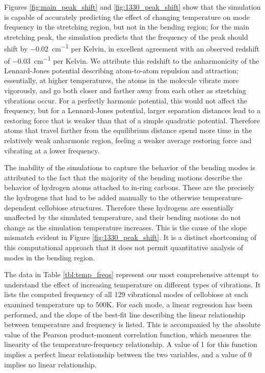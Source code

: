 Figures \ref{fig:main_peak_shift} and \ref{fig:1330_peak_shift} show that the simulation is capable of accurately predicting the effect of changing temperature on mode frequency in the stretching region, but not in the bending region; for the main stretching peak, the simulation predicts that the frequency of the peak should shift by \SI{-0.02}{cm^{-1}} per Kelvin, in excellent agreement with an observed redshift of \SI{-0.03}{cm^{-1}} per Kelvin. We attribute this redshift to the anharmonicity of the Lennard-Jones potential describing atom-to-atom repulsion and attraction; essentially, at higher temperatures, the atoms in the molecule vibrate more vigorously, and go both closer and farther away from each other as stretching vibrations occur. For a perfectly harmonic potential, this would not affect the frequency, but for a Lennard-Jones potential, larger separation distances lead to a restoring force that is weaker than that of a simple quadratic potential. Therefore atoms that travel farther from the equilibrium distance spend more time in the relatively weak anharmonic region, feeling a weaker average restoring force and vibrating at a lower frequency.

The inability of the simulations to capture the behavior of the bending modes is attributed to the fact that the majority of the bending motions describe the behavior of hydrogen atoms attached to in-ring carbons. These are the precisely the hydrogens that had to be added manually to the otherwise temperature-dependent cellobiose structures. Therefore these hydrogens are essentially unaffected by the simulated temperature, and their bending motions do not change as the simulation temperature increases. This is the cause of the slope mismatch evident in Figure \ref{fig:1330_peak_shift}. It is a distinct shortcoming of this computational approach that it does not permit quantitative analysis of modes in the bending region.

The data in Table \ref{tbl:temp_freqs} represent our most comprehensive attempt to understand the effect of increasing temperature on different types of vibrations. It lists the computed frequency of all 129 vibrational modes of cellobiose at each examined temperature up to 500K. For each mode, a linear regression has been performed, and the slope of the best-fit line describing the linear relationship between temperature and frequency is listed. This is accompanied by the absolute value of the Pearson product-moment correlation function, which measures the linearity of the temperature-frequency relationship. A value of 1 for this function implies a perfect linear relationship between the two variables, and a value of 0 implies no linear relationship.

